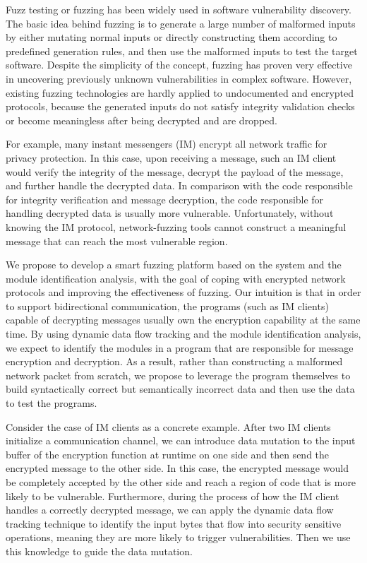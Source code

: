 Fuzz testing or fuzzing has been widely used in software vulnerability
discovery. The basic idea behind fuzzing is to generate a large number
of malformed inputs by either mutating normal inputs or directly
constructing them according to predefined generation rules, and then use
the malformed inputs to test the target software. Despite the simplicity of
the concept, fuzzing has proven very effective in uncovering previously
unknown vulnerabilities in complex software. However, existing fuzzing
technologies are hardly applied to undocumented and encrypted protocols,
because the generated inputs do not satisfy integrity validation checks or
become meaningless after being decrypted and are dropped.

For example, many instant messengers (IM) encrypt all network
traffic for privacy protection. In this case, upon receiving a message,
such an IM client would verify the integrity of the message, decrypt the
payload of the message, and further handle the decrypted data.  In
comparison with the code responsible for integrity verification and
message decryption, the code responsible for handling decrypted data is
usually more vulnerable. Unfortunately, without knowing the IM protocol,
network-fuzzing tools cannot construct a meaningful message that can
reach the most vulnerable region.

We propose to develop a smart fuzzing platform based on the
\dynamicsys system and the module identification analysis, with the goal
of coping with encrypted network protocols and improving the effectiveness
of fuzzing.  Our intuition is that in order to support
bidirectional communication, the programs (such as IM clients) capable
of decrypting messages usually own the encryption capability at the same
time.  By using dynamic data flow tracking and the module identification
analysis, we expect to identify the modules in a program that are
responsible for message encryption and decryption. As a result, rather
than constructing a malformed network packet from scratch, we
propose to leverage the program themselves to build syntactically
correct but semantically incorrect data and then use the data to test
the programs.

Consider the case of IM clients as a concrete example.  After two IM clients
initialize a communication channel, we can introduce data mutation to the
input buffer of the encryption function at runtime on one side and then send
the encrypted message to the other side. In this case, the encrypted message
would be completely accepted by the other side and reach a region of code that
is more likely to be vulnerable.  Furthermore, during the process of how the
IM client handles a correctly decrypted message, we can apply the dynamic data
flow tracking technique to identify the input bytes that flow into security
sensitive operations, meaning they are more likely to trigger vulnerabilities.
Then we use this knowledge to guide the data mutation.
